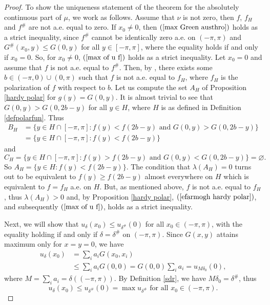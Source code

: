 \documentclass[11pt]{amsart}
\numberwithin{equation}{section}
\begin{document}
\begin{proof}
\par To show the uniqueness statement of the theorem for the absolutely continuous part of \(\mu\), we work as follows. Assume that \(\nu\) is not zero, then \(f\), \(f_H\) and \(f^\#\) are not a.e. equal to zero.  If \(x_0\neq0\), then \((\ref{max Green austhro})\) holds as a strict inequality, since \(f^\#\) cannot be identically zero a.e. on \((-\pi,\pi)\) and \(G^\#(x_0,y)\leq G(0,y)\) for all \(y\in[-\pi,\pi]\), where the equality holds if and only if \(x_0=0\). So, for \(x_0\neq0\), \((\ref{max of u f})\) holds as a strict inequality. Let \(x_0=0\) and assume that \(f\) is not a.e. equal to \(f^\#\). Then, by \cite[Lemma 1.38]{Baernstein}, there exists some \(b\in(-\pi,0)\cup(0,\pi)\) such that \(f\) is not a.e. equal to \(f_H\), where \(f_H\) is the polarization of \(f\) with respect to \(b\). Let us compute the set \(A_H\) of Proposition \ref{hardy polar} for \(g(y)=G(0,y)\). It is almost trivial to see that \(G(0,y)>G(0,2b-y)\) for all \(y\in H\), where \(H\) is as defined in Definition \ref{defpolarfun}. Thus
\begin{align*}
B_H&=\{y\in H\cap[-\pi,\pi]:f(y)<f(2b-y)\text{ and }G(0,y)>G(0,2b-y)\}\\
&=\{y\in H\cap[-\pi,\pi]:f(y)<f(2b-y)\}
\end{align*}
and
\[C_H=\{y\in H\cap[-\pi,\pi]:f(y)>f(2b-y)\text{ and }G(0,y)<G(0,2b-y)\}
=\varnothing.\]
So \(A_H=\{y\in H:f(y)<f(2b-y)\}\).
The condition that \(\lambda(A_H)=0\) turns out to be equivalent to \(f(y)\geq f(2b-y)\) almost everywhere on \(H\) which is equivalent to \(f=f_H\) a.e. on \(H.\) But, as mentioned above, \(f\) is not a.e. equal to \(f_H\), thus \(\lambda(A_H)>0\) and, by Proposition \ref{hardy polar}, \((\ref{efarmogh hardy polar})\), and subsequently \((\ref{max of u f})\), holds as a strict inequality.
\par Next, we will show that \(u_\delta(x_0)\leq u_{\delta^\#}(0)\) for all \(x_0\in(-\pi,\pi)\), with the equality holding if and only if \(\delta=\delta^\#\) on \((-\pi,\pi)\). Since \(G(x,y)\) attains maximum only for \(x=y=0\), we have
\begin{align}\label{max of u d}
\nonumber u_\delta(x_0)&=\sum_i a_i G(x_0,x_i)\\
&\leq\sum_i a_i G(0,0)
=G(0,0)\sum_i a_i=u_{M\delta_0}(0),
\end{align}
where \(M=\sum_i a_i=\delta((-\pi,\pi))\). By Definition \ref{sdr}, we have \(M\delta_0=\delta^\#\), thus
\begin{equation}\label{max of u delta}
u_\delta(x_0)\leq u_{\delta^\#}(0)=\max u_{\delta^\#}\text{ for all }x_0\in(-\pi,\pi).

\end{equation}
\end{proof}
\end{document}
